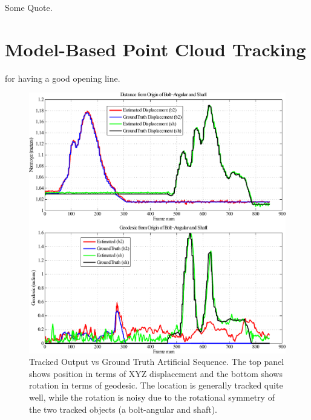 \begin{savequote}[75mm]
Some Quote.
\end{savequote}

\chapter{Model-Based Point Cloud Tracking}
\label{Chap:ModelBasedTracking}
 for having a good opening line. 

\begin{figure}[!ht]
  \centering
  \includegraphics[width=\linewidth]{figures/Tracking/CombinedNoNoise.pdf}
  \caption[Tracked Output vs Ground Truth Artificial Sequence]{Tracked Output vs Ground Truth Artificial Sequence. The top panel shows position in terms of XYZ displacement and the bottom shows rotation in terms of geodesic. The location is generally tracked quite well, while the rotation is noisy due to the rotational symmetry of the two tracked objects (a bolt-angular and shaft).}
  \label{fig:CombinedNoNoise}
\end{figure}

